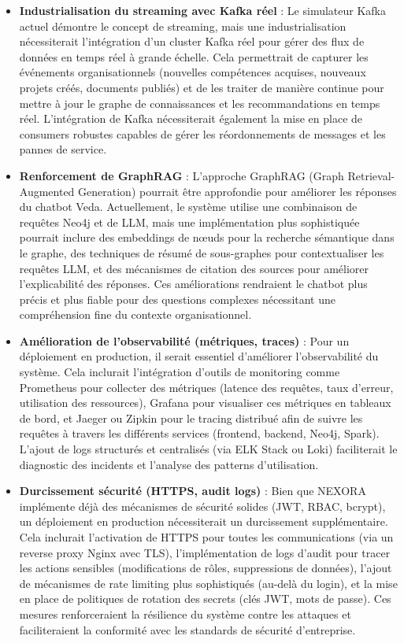 \documentclass[12pt,a4paper]{report}
\begin{document}
\begin{itemize}
  \item \textbf{Industrialisation du streaming avec Kafka réel} : Le simulateur Kafka actuel démontre le concept de streaming, mais une industrialisation nécessiterait l'intégration d'un cluster Kafka réel pour gérer des flux de données en temps réel à grande échelle. Cela permettrait de capturer les événements organisationnels (nouvelles compétences acquises, nouveaux projets créés, documents publiés) et de les traiter de manière continue pour mettre à jour le graphe de connaissances et les recommandations en temps réel. L'intégration de Kafka nécessiterait également la mise en place de consumers robustes capables de gérer les réordonnements de messages et les pannes de service.

  \item \textbf{Renforcement de GraphRAG} : L'approche GraphRAG (Graph Retrieval-Augmented Generation) pourrait être approfondie pour améliorer les réponses du chatbot Veda. Actuellement, le système utilise une combinaison de requêtes Neo4j et de LLM, mais une implémentation plus sophistiquée pourrait inclure des embeddings de nœuds pour la recherche sémantique dans le graphe, des techniques de résumé de sous-graphes pour contextualiser les requêtes LLM, et des mécanismes de citation des sources pour améliorer l'explicabilité des réponses. Ces améliorations rendraient le chatbot plus précis et plus fiable pour des questions complexes nécessitant une compréhension fine du contexte organisationnel.

  \item \textbf{Amélioration de l'observabilité (métriques, traces)} : Pour un déploiement en production, il serait essentiel d'améliorer l'observabilité du système. Cela inclurait l'intégration d'outils de monitoring comme Prometheus pour collecter des métriques (latence des requêtes, taux d'erreur, utilisation des ressources), Grafana pour visualiser ces métriques en tableaux de bord, et Jaeger ou Zipkin pour le tracing distribué afin de suivre les requêtes à travers les différents services (frontend, backend, Neo4j, Spark). L'ajout de logs structurés et centralisés (via ELK Stack ou Loki) faciliterait le diagnostic des incidents et l'analyse des patterns d'utilisation.

  \item \textbf{Durcissement sécurité (HTTPS, audit logs)} : Bien que NEXORA implémente déjà des mécanismes de sécurité solides (JWT, RBAC, bcrypt), un déploiement en production nécessiterait un durcissement supplémentaire. Cela inclurait l'activation de HTTPS pour toutes les communications (via un reverse proxy Nginx avec TLS), l'implémentation de logs d'audit pour tracer les actions sensibles (modifications de rôles, suppressions de données), l'ajout de mécanismes de rate limiting plus sophistiqués (au-delà du login), et la mise en place de politiques de rotation des secrets (clés JWT, mots de passe). Ces mesures renforceraient la résilience du système contre les attaques et faciliteraient la conformité avec les standards de sécurité d'entreprise.
\end{itemize}
\end{document}
